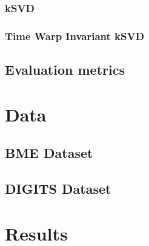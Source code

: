 \documentclass[11pt]{article}
\begin{document}
\subsubsection{kSVD}

\paragraph{} 

\subsubsection{Time Warp Invariant kSVD}

\paragraph{} 

\subsection{Evaluation metrics}

\paragraph{} 


\section{Data}

\subsection{BME Dataset}

\paragraph{} 

\subsection{DIGITS Dataset}

\paragraph{} 


\section{Results}
\end{document}
